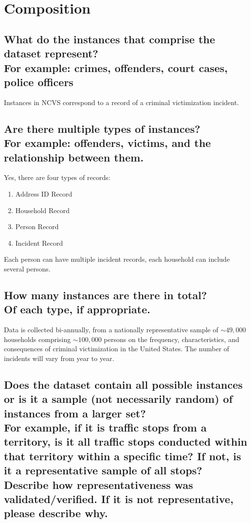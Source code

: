 \documentclass[letterpaper, 10 pt, conference]{ieeeconf}  %
\newcommand{\subtitle}[1]{{\\ \small \normalfont \color{purple} #1}}
\begin{document}
\section{Composition}

\subsection{What do the instances that comprise the dataset represent? \subtitle{For example: crimes, offenders, court cases, police officers}}

Instances in NCVS correspond to a record of a criminal victimization incident.

\subsection{Are there multiple types of instances? \subtitle{For example: offenders, victims, and the relationship between them.}}

Yes, there are four types of records:

\begin{enumerate}
    \item Address ID Record
    \item Household Record
    \item Person Record
    \item Incident Record
\end{enumerate}

Each person can have multiple incident records, each household can include several persons. 

\subsection{How many instances are there in total? \subtitle{Of each type, if appropriate.}}

Data is collected bi-annually, from a nationally representative sample of $\sim 49,000$ households comprising $\sim 100,000$ persons on the frequency, characteristics, and consequences of criminal victimization in the United States. The number of incidents will vary from year to year.

\subsection{Does the dataset contain all possible instances or is it a sample (not necessarily random) of instances from a larger set? \subtitle{For example, if it is traffic stops from a territory, is it all traffic stops conducted within that territory within a specific time? If not, is it a representative sample of all stops? Describe how representativeness was validated/verified. If it is not representative, please describe why.}}
\end{document}
